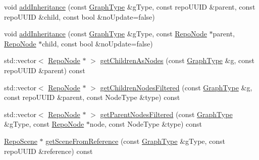 \begin{DoxyCompactItemize}
\item 
void \hyperlink{classrepo_1_1core_1_1model_1_1_repo_scene_a2c207776463353a6eafd430914838a97}{add\+Inheritance} (const \hyperlink{classrepo_1_1core_1_1model_1_1_repo_scene_aefcacd6eb4c7774ac1bfe3a6b223337c}{Graph\+Type} \&g\+Type, const repo\+U\+U\+I\+D \&parent, const repo\+U\+U\+I\+D \&child, const bool \&no\+Update=false)
\item 
void \hyperlink{classrepo_1_1core_1_1model_1_1_repo_scene_a7a4c10fe8521f9c06f492b11ab6a825c}{add\+Inheritance} (const \hyperlink{classrepo_1_1core_1_1model_1_1_repo_scene_aefcacd6eb4c7774ac1bfe3a6b223337c}{Graph\+Type} \&g\+Type, const \hyperlink{classrepo_1_1core_1_1model_1_1_repo_node}{Repo\+Node} $\ast$parent, \hyperlink{classrepo_1_1core_1_1model_1_1_repo_node}{Repo\+Node} $\ast$child, const bool \&no\+Update=false)
\item 
std\+::vector$<$ \hyperlink{classrepo_1_1core_1_1model_1_1_repo_node}{Repo\+Node} $\ast$ $>$ \hyperlink{classrepo_1_1core_1_1model_1_1_repo_scene_a829df4beb0d3edcdfbb9c6445f8a4704}{get\+Children\+As\+Nodes} (const \hyperlink{classrepo_1_1core_1_1model_1_1_repo_scene_aefcacd6eb4c7774ac1bfe3a6b223337c}{Graph\+Type} \&g, const repo\+U\+U\+I\+D \&parent) const 
\item 
std\+::vector$<$ \hyperlink{classrepo_1_1core_1_1model_1_1_repo_node}{Repo\+Node} $\ast$ $>$ \hyperlink{classrepo_1_1core_1_1model_1_1_repo_scene_a0b2a95dc5643d39fd2d65f65ccbecbc4}{get\+Children\+Nodes\+Filtered} (const \hyperlink{classrepo_1_1core_1_1model_1_1_repo_scene_aefcacd6eb4c7774ac1bfe3a6b223337c}{Graph\+Type} \&g, const repo\+U\+U\+I\+D \&parent, const Node\+Type \&type) const 
\item 
std\+::vector$<$ \hyperlink{classrepo_1_1core_1_1model_1_1_repo_node}{Repo\+Node} $\ast$ $>$ \hyperlink{classrepo_1_1core_1_1model_1_1_repo_scene_a722d51e5ef017ca8ea56632f8783b26d}{get\+Parent\+Nodes\+Filtered} (const \hyperlink{classrepo_1_1core_1_1model_1_1_repo_scene_aefcacd6eb4c7774ac1bfe3a6b223337c}{Graph\+Type} \&g\+Type, const \hyperlink{classrepo_1_1core_1_1model_1_1_repo_node}{Repo\+Node} $\ast$node, const Node\+Type \&type) const 
\item 
\hyperlink{classrepo_1_1core_1_1model_1_1_repo_scene}{Repo\+Scene} $\ast$ \hyperlink{classrepo_1_1core_1_1model_1_1_repo_scene_a189b939059994f16c99b67409bdcebf5}{get\+Scene\+From\+Reference} (const \hyperlink{classrepo_1_1core_1_1model_1_1_repo_scene_aefcacd6eb4c7774ac1bfe3a6b223337c}{Graph\+Type} \&g\+Type, const repo\+U\+U\+I\+D \&reference) const 
\item 

\end{DoxyCompactItemize}
